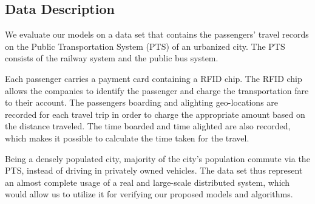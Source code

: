 \documentclass[conference]{IEEEtran.1.8}
\begin{document}
\subsection{Data Description}

We evaluate our models on a data set that contains the passengers' travel records on the Public Transportation System (PTS) of an urbanized city. The PTS consists of the railway system and the public bus system.


Each passenger carries a payment card containing a RFID chip. The RFID chip allows the companies to identify the passenger and charge the transportation fare to their account. The passengers boarding and alighting geo-locations are recorded for each travel trip in order to charge the appropriate amount based on the distance traveled. The time boarded and time alighted are also recorded, which makes it possible to calculate the time taken for the travel.

Being a densely populated city, majority of the city's population commute via the PTS, instead of driving in privately owned vehicles. The data set thus represent an almost complete usage of a real and large-scale distributed system, which would allow us to utilize it for verifying our proposed models and algorithms.
\end{document}
